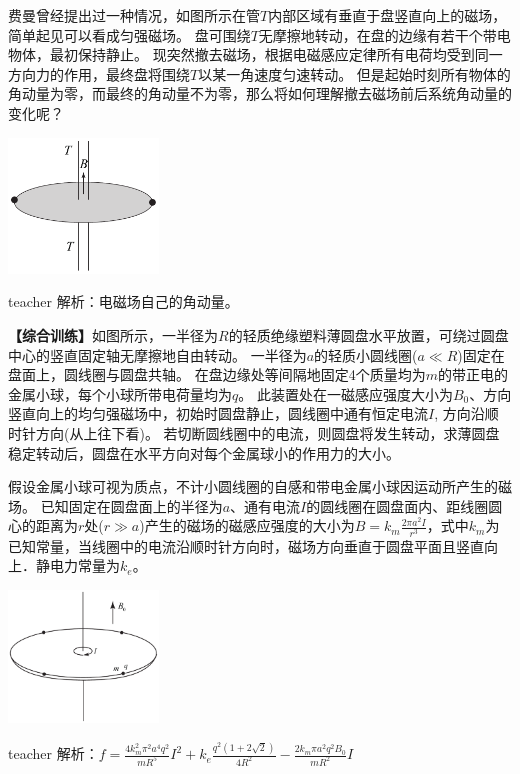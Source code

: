 \begin{example}
费曼曾经提出过一种情况，如图所示在管$T$内部区域有垂直于盘竖直向上的磁场，简单起见可以看成匀强磁场。
盘可围绕$T$无摩擦地转动，在盘的边缘有若干个带电物体，最初保持静止。
现突然撤去磁场，根据电磁感应定律所有电荷均受到同一方向力的作用，最终盘将围绕$T$以某一角速度匀速转动。
但是起始时刻所有物体的角动量为零，而最终的角动量不为零，那么将如何理解撤去磁场前后系统角动量的变化呢？
\begin{flushright}
\includegraphics[width = 0.3\textwidth]{images/mag-18.pdf} 
\end{flushright}
\begin{taggedblock}{teacher}
\noindent
解析：电磁场自己的角动量。
\end{taggedblock}
\end{example}


\begin{example}
\textbf{【综合训练】}如图所示，一半径为$R$的轻质绝缘塑料薄圆盘水平放置，可绕过圆盘中心的竖直固定轴无摩擦地自由转动。
一半径为$a$的轻质小圆线圈($a\ll R$)固定在盘面上，圆线圈与圆盘共轴。
在盘边缘处等间隔地固定4个质量均为$m$的带正电的金属小球，每个小球所带电荷量均为$q$。
此装置处在一磁感应强度大小为$B_0$、方向竖直向上的均匀强磁场中，初始时圆盘静止，圆线圈中通有恒定电流$I$,
方向沿顺时针方向(从上往下看)。
若切断圆线圈中的电流，则圆盘将发生转动，求薄圆盘稳定转动后，圆盘在水平方向对每个金属球小的作用力的大小。

假设金属小球可视为质点，不计小圆线圈的自感和带电金属小球因运动所产生的磁场。
已知固定在圆盘面上的半径为$a$、通有电流$I$的圆线圈在圆盘面内、距线圈圆心的距离为$r$处($r\gg a$)产生的磁场的磁感应强度的大小为$B=k_m\frac{2\pi a^2 I}{r^3}$，式中$k_m$为已知常量，当线圈中的电流沿顺时针方向时，磁场方向垂直于圆盘平面且竖直向上．静电力常量为$k_e$。
\begin{flushright}
\includegraphics[width = 0.3\textwidth]{images/mag-19.pdf} 
\end{flushright}



\begin{taggedblock}{teacher}
\noindent
解析：$f=\frac{4k_m^2\pi^2a^4q^2}{mR^5}I^2+k_e\frac{q^2(1+2\sqrt{2})}{4R^2}-\frac{2k_m\pi a^2q^2B_0}{mR^2}I$
\end{taggedblock}
\end{example}


